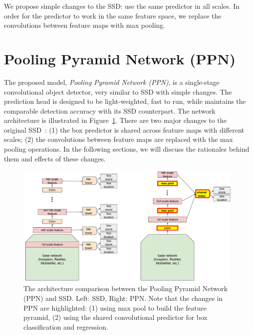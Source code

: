\documentclass[10pt,twocolumn,letterpaper]{article}
\begin{document}
We propose simple changes to the SSD: use the same predictor
in all scales. In order for the predictor to work in the
same feature space, we replace the convolutions between
feature maps with max pooling.










\section{Pooling Pyramid Network (PPN)}
The proposed model, \textit{Pooling Pyramid Network (PPN)},
is a single-stage convolutional object detector, very
similar to SSD with simple changes.  The prediction head is
designed to be light-weighted, fast to run, while maintains
the comparable detection accuracy with its SSD counterpart.
The network architecture is illustrated in
Figure~\ref{fig:ppn}.  There are two major changes to the
original SSD~\cite{liu2016ssd}: (1) the box predictor is
shared across feature maps with different scales; (2) the
convolutions between feature maps are replaced with the max
pooling operations.  In the following sections, we will
discuss the rationales behind them and effects of these
changes.

\begin{figure}[t]
\begin{center}
\includegraphics[width=1.0\linewidth]{figure/ppn_vs_ssd.pdf}
\end{center}
\caption{
The architecture comparison between the Pooling Pyramid Network (PPN)
and SSD. Left: SSD, Right: PPN.
Note that the changes in PPN are highlighted:
(1) using max pool to build the feature pyramid,
(2) using the shared convolutional predictor for box classification and regression.
}
\label{fig:ppn}
\end{figure}
\end{document}
